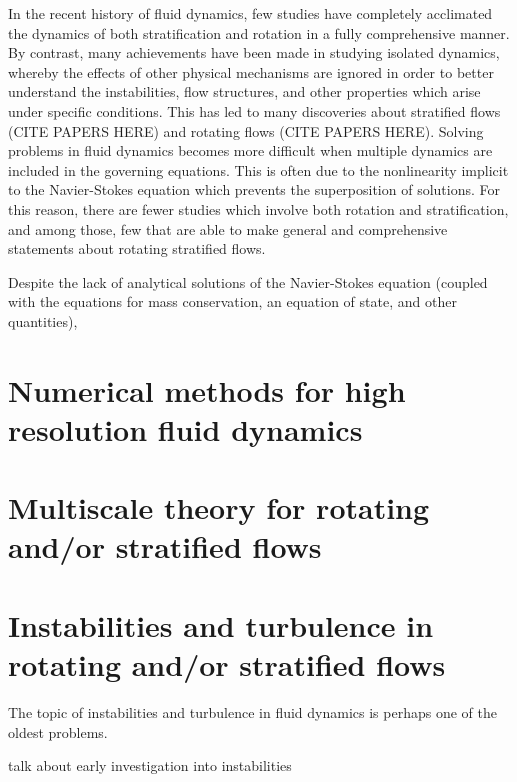 \documentclass[lineno]{jfm}
\begin{document}
In the recent history of fluid dynamics, few studies have completely acclimated
the dynamics of both stratification and rotation in a fully comprehensive
manner. By contrast, many achievements have been made in studying isolated
dynamics, whereby the effects of other physical mechanisms are ignored in order to
better understand the instabilities, flow structures, and other properties which arise
under specific conditions. This has led to many discoveries about stratified flows ({\red CITE PAPERS HERE}) and rotating
flows ({\red CITE PAPERS HERE}). Solving problems in fluid dynamics becomes
more difficult when multiple dynamics are included in the governing
equations. This is often due to the nonlinearity implicit to the Navier-Stokes
equation which prevents the superposition of solutions. For this reason, there
are fewer studies which involve both rotation and stratification, and among
those, few that are able to make general and comprehensive statements about rotating stratified
flows.

Despite the lack of analytical solutions of the Navier-Stokes equation
(coupled with the equations for mass conservation, an equation of state, and
other quantities), 


\section{Numerical methods for high resolution fluid dynamics}
\label{sec:nummethods}
\section{Multiscale theory for rotating and/or stratified flows}
\label{sec:multiscale}

\section{Instabilities and turbulence in rotating and/or stratified
flows}
\label{sec:instabilitesturbulence}
The topic of instabilities and turbulence in fluid dynamics is perhaps one of
the oldest problems. 

{\red talk about early investigation into instabilities}
\end{document}
